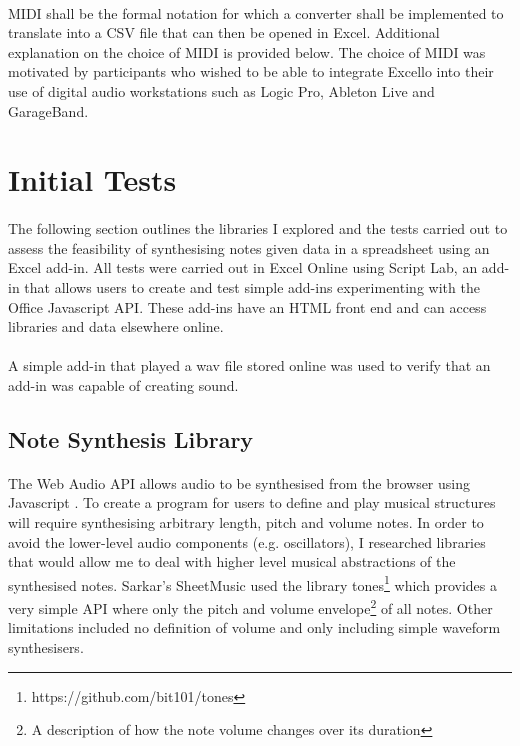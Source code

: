 \paragraph{} MIDI shall be the formal notation for which a converter shall be implemented to translate into a CSV file that can then be opened in Excel. Additional explanation on the choice of MIDI is provided below. The choice of MIDI was motivated by participants who wished to be able to integrate Excello into their use of digital audio workstations such as Logic Pro, Ableton Live and GarageBand.

\section{Initial Tests}

\paragraph{} The following section outlines the libraries I explored and the tests carried out to assess the feasibility of synthesising notes given data in a spreadsheet using an Excel add-in. All tests were carried out in Excel Online using Script Lab, an add-in that allows users to create and test simple add-ins experimenting with the Office Javascript API. These add-ins have an HTML front end and can access libraries and data elsewhere online.

\paragraph{} A simple add-in that played a wav file stored online was used to verify that an add-in was capable of creating sound.

\subsection{Note Synthesis Library}

\paragraph{} The Web Audio API allows audio to be synthesised from the browser using Javascript \cite{mozilla:webaudioapi}. To create a program for users to define and play musical structures will require synthesising arbitrary length, pitch and volume notes. In order to avoid the lower-level audio components (e.g. oscillators), I researched libraries that would allow me to deal with higher level musical abstractions of the synthesised notes. Sarkar's SheetMusic used the library tones\footnote{https://github.com/bit101/tones} which provides a very simple API where only the pitch and volume envelope\footnote{A description of how the note volume changes over its duration} of all notes. Other limitations included no definition of volume and only including simple waveform synthesisers.

